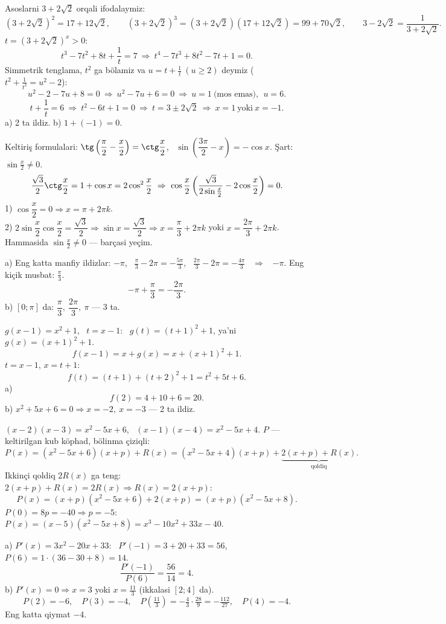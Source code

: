 \newpage
{}
Asoslarni $3+2\sqrt2$ orqali ifodalaymiz:
\[(3+2\sqrt2)^2=17+12\sqrt2,\qquad (3+2\sqrt2)^3=(3+2\sqrt2)(17+12\sqrt2)=99+70\sqrt2,\qquad 3-2\sqrt2=\frac1{3+2\sqrt2}.\]
$t=(3+2\sqrt2)^x>0$:
\[t^3-7t^2+8t+\frac1t=7\ \Rightarrow\ t^4-7t^3+8t^2-7t+1=0.\]
Simmetrik tenglama, $t^2$ ga bölamiz va $u=t+\frac1t\ (u\ge2)$ deymiz ($t^2+\frac1{t^2}=u^2-2$):
\[u^2-2-7u+8=0\ \Rightarrow\ u^2-7u+6=0\ \Rightarrow\ u=1\ \text{(mos emas)},\ \ u=6.\]
\[t+\frac1t=6\ \Rightarrow\ t^2-6t+1=0\ \Rightarrow\ t=3\pm2\sqrt2\ \Rightarrow\ x=1\ \text{yoki}\ x=-1.\]
a) 2 ta ildiz. \qquad b) $1+(-1)=0$.

\newpage
{}
Keltiriş formulalari: $\tg\left(\dfrac\pi2-\dfrac x2\right)=\ctg\dfrac x2$, \ $\sin\left(\dfrac{3\pi}2-x\right)=-\cos x$. Şart: $\sin\frac x2\ne0$.
\[\frac{\sqrt3}2\ctg\frac x2=1+\cos x=2\cos^2\frac x2\ \Rightarrow\ \cos\frac x2\left(\frac{\sqrt3}{2\sin\frac x2}-2\cos\frac x2\right)=0.\]
1) $\cos\dfrac x2=0\Rightarrow x=\pi+2\pi k$.\\
2) $2\sin\dfrac x2\cos\dfrac x2=\dfrac{\sqrt3}2\Rightarrow\sin x=\dfrac{\sqrt3}2\Rightarrow x=\dfrac\pi3+2\pi k$ yoki $x=\dfrac{2\pi}3+2\pi k$.\\
Hammasida $\sin\frac x2\ne0$ — barçasi yeçim.

a) Eng katta manfiy ildizlar: $-\pi$, \ $\frac\pi3-2\pi=-\frac{5\pi}3$, \ $\frac{2\pi}3-2\pi=-\frac{4\pi}3$ \ $\Rightarrow$ \ $-\pi$. Eng kiçik musbat: $\frac\pi3$.
\[-\pi+\frac\pi3=-\frac{2\pi}3.\]
b) $[0;\pi]$ da: $\dfrac\pi3,\ \dfrac{2\pi}3,\ \pi$ — 3 ta.

\newpage
{}
$g(x-1)=x^2+1$, \ $t=x-1$: \ $g(t)=(t+1)^2+1$, ya'ni $g(x)=(x+1)^2+1$.
\[f(x-1)=x+g(x)=x+(x+1)^2+1.\]
$t=x-1$, $x=t+1$:
\[f(t)=(t+1)+(t+2)^2+1=t^2+5t+6.\]
a) \[f(2)=4+10+6=20.\]
b) $x^2+5x+6=0\Rightarrow x=-2,\ x=-3$ — 2 ta ildiz.

\newpage
{}
$(x-2)(x-3)=x^2-5x+6$, \ $(x-1)(x-4)=x^2-5x+4$. $P$ — keltirilgan kub köphad, bölinma çiziqli:
\[P(x)=(x^2-5x+6)(x+p)+R(x)=(x^2-5x+4)(x+p)+\underbrace{2(x+p)+R(x)}_{\text{qoldiq}}.\]
Ikkinçi qoldiq $2R(x)$ ga teng: $2(x+p)+R(x)=2R(x)\Rightarrow R(x)=2(x+p)$:
\[P(x)=(x+p)(x^2-5x+6)+2(x+p)=(x+p)(x^2-5x+8).\]
$P(0)=8p=-40\Rightarrow p=-5$: \ $P(x)=(x-5)(x^2-5x+8)=x^3-10x^2+33x-40$.

a) $P'(x)=3x^2-20x+33$: \ $P'(-1)=3+20+33=56$, \ $P(6)=1\cdot(36-30+8)=14$.
\[\frac{P'(-1)}{P(6)}=\frac{56}{14}=4.\]
b) $P'(x)=0\Rightarrow x=3$ yoki $x=\frac{11}3$ (ikkalasi $[2;4]$ da).
\[P(2)=-6,\quad P(3)=-4,\quad P\!\left(\tfrac{11}3\right)=-\tfrac43\cdot\tfrac{28}9=-\tfrac{112}{27},\quad P(4)=-4.\]
Eng katta qiymat $-4$.

